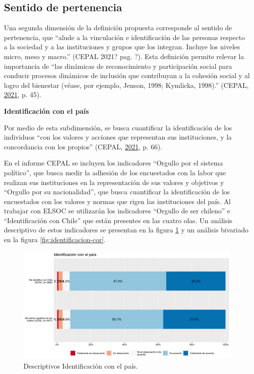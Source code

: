 \documentclass[
  12pt,
]{book}
\begin{document}
\hypertarget{sentido-de-pertenencia}{%
\subsection{Sentido de pertenencia}\label{sentido-de-pertenencia}}

Una segunda dimensión de la definición propuesta corresponde al sentido de pertenencia, que ``alude a la vinculación e identificación de las personas respecto a la sociedad y a las instituciones y grupos que los integran. Incluye los niveles micro, meso y macro.'' (CEPAL 2021? pag. ?). Esta definición permite relevar la importancia de ``las dinámicas de reconocimiento y participación social para conducir procesos dinámicos de inclusión que contribuyan a la cohesión social y al logro del bienestar (véase, por ejemplo, Jenson, 1998; Kymlicka, 1998).'' (CEPAL, \protect\hyperlink{ref-cepal_Cohesion_2021}{2021}, p. 45).

\textbf{Identificación con el país}

Por medio de esta subdimensión, se busca cuantificar la identificación de los individuos ``con los valores y acciones que representan sus instituciones, y la concordancia con los propios'' (CEPAL, \protect\hyperlink{ref-cepal_Cohesion_2021}{2021}, p. 66).

En el informe CEPAL se incluyen los indicadores ``Orgullo por el sistema político'', que busca medir la adhesión de los encuestados con la labor que realizan sus instituciones en la representación de sus valores y objetivos y ``Orgullo por su nacionalidad'', que busca cuantificar la identificación de los encuestados con los valores y normas que rigen las instituciones del país. Al trabajar con ELSOC se utilizarán los indicadores ``Orgullo de ser chileno'' e ``Identificación con Chile'' que están presentes en las cuatro olas. Un análisis descriptivo de estos indicadores se presentan en la figura \ref{fig:identificacion} y un análisis bivariado en la figura \ref{fig:identificacion-cor}.

\begin{figure}[H]

{\centering \includegraphics[width=1\linewidth,height=1\textheight]{output/graphs/identificacion} 

}

\caption{Descriptivos Identificación con el país.}\label{fig:identificacion}
\end{figure}
\end{document}
